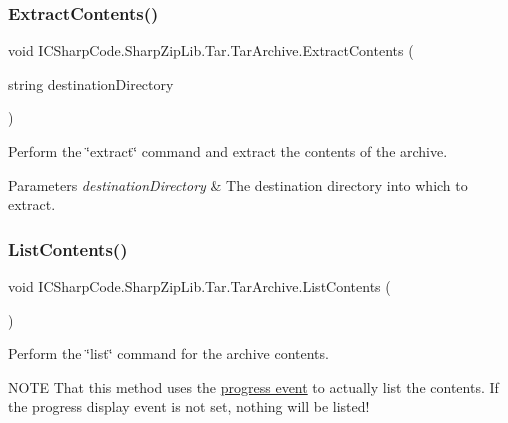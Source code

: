 \subsubsection{\texorpdfstring{Extract\+Contents()}{ExtractContents()}}
{\footnotesize\ttfamily void I\+C\+Sharp\+Code.\+Sharp\+Zip\+Lib.\+Tar.\+Tar\+Archive.\+Extract\+Contents (\begin{DoxyParamCaption}\item[{string}]{destination\+Directory }\end{DoxyParamCaption})\hspace{0.3cm}{\ttfamily [inline]}}



Perform the \char`\"{}extract\char`\"{} command and extract the contents of the archive. 


\begin{DoxyParams}{Parameters}
{\em destination\+Directory} & The destination directory into which to extract. \\
\hline
\end{DoxyParams}
\mbox{\label{class_i_c_sharp_code_1_1_sharp_zip_lib_1_1_tar_1_1_tar_archive_a0a45311b31ed0e3f9864fdfb13f44f26}} 
\subsubsection{\texorpdfstring{List\+Contents()}{ListContents()}}
{\footnotesize\ttfamily void I\+C\+Sharp\+Code.\+Sharp\+Zip\+Lib.\+Tar.\+Tar\+Archive.\+List\+Contents (\begin{DoxyParamCaption}{ }\end{DoxyParamCaption})\hspace{0.3cm}{\ttfamily [inline]}}



Perform the \char`\"{}list\char`\"{} command for the archive contents. 

N\+O\+TE That this method uses the \hyperlink{class_i_c_sharp_code_1_1_sharp_zip_lib_1_1_tar_1_1_tar_archive_a2471cdc0871512dd5a26250957268ad4}{progress event} to actually list the contents. If the progress display event is not set, nothing will be listed! \mbox{\label{class_i_c_sharp_code_1_1_sharp_zip_lib_1_1_tar_1_1_tar_archive_a5ddc4195d8b5b959abe4e2603c731d22}} 
